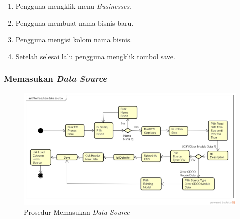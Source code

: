 	\begin{enumerate}
		\item Pengguna mengklik menu \textit{Businesses}.
		\item Pengguna membuat nama bisnis baru.
		\item Pengguna mengisi kolom nama bisnis.
		\item Setelah selesai lalu pengguna mengklik tombol save.
	\end{enumerate}
	
	
	\subsubsection{Memasukan \textit{Data Source}}

	\begin{figure}[h]
	\centering
	\includegraphics[scale=0.5]{Gambar/Memasukan-data-source}
	\caption{Prosedur Memasukan \textit{Data Source}}
	\end{figure}
	
